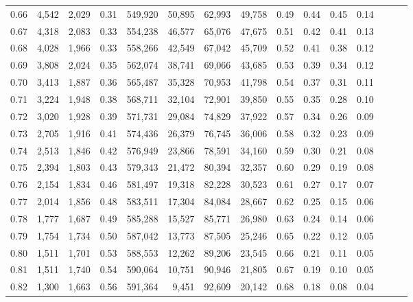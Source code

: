 \begin{tabular}{rrrrrrrrrrrrrrr}
0.66 &   4,542 &  2,029 &  0.31 &  549,920 &   50,895 &   62,993 &   49,758 &  0.49 &  0.44 &  0.45 &      0.14 \\
0.67 &   4,318 &  2,083 &  0.33 &  554,238 &   46,577 &   65,076 &   47,675 &  0.51 &  0.42 &  0.41 &      0.13 \\
0.68 &   4,028 &  1,966 &  0.33 &  558,266 &   42,549 &   67,042 &   45,709 &  0.52 &  0.41 &  0.38 &      0.12 \\
0.69 &   3,808 &  2,024 &  0.35 &  562,074 &   38,741 &   69,066 &   43,685 &  0.53 &  0.39 &  0.34 &      0.12 \\
0.70 &   3,413 &  1,887 &  0.36 &  565,487 &   35,328 &   70,953 &   41,798 &  0.54 &  0.37 &  0.31 &      0.11 \\
0.71 &   3,224 &  1,948 &  0.38 &  568,711 &   32,104 &   72,901 &   39,850 &  0.55 &  0.35 &  0.28 &      0.10 \\
0.72 &   3,020 &  1,928 &  0.39 &  571,731 &   29,084 &   74,829 &   37,922 &  0.57 &  0.34 &  0.26 &      0.09 \\
0.73 &   2,705 &  1,916 &  0.41 &  574,436 &   26,379 &   76,745 &   36,006 &  0.58 &  0.32 &  0.23 &      0.09 \\
0.74 &   2,513 &  1,846 &  0.42 &  576,949 &   23,866 &   78,591 &   34,160 &  0.59 &  0.30 &  0.21 &      0.08 \\
0.75 &   2,394 &  1,803 &  0.43 &  579,343 &   21,472 &   80,394 &   32,357 &  0.60 &  0.29 &  0.19 &      0.08 \\
0.76 &   2,154 &  1,834 &  0.46 &  581,497 &   19,318 &   82,228 &   30,523 &  0.61 &  0.27 &  0.17 &      0.07 \\
0.77 &   2,014 &  1,856 &  0.48 &  583,511 &   17,304 &   84,084 &   28,667 &  0.62 &  0.25 &  0.15 &      0.06 \\
0.78 &   1,777 &  1,687 &  0.49 &  585,288 &   15,527 &   85,771 &   26,980 &  0.63 &  0.24 &  0.14 &      0.06 \\
0.79 &   1,754 &  1,734 &  0.50 &  587,042 &   13,773 &   87,505 &   25,246 &  0.65 &  0.22 &  0.12 &      0.05 \\
0.80 &   1,511 &  1,701 &  0.53 &  588,553 &   12,262 &   89,206 &   23,545 &  0.66 &  0.21 &  0.11 &      0.05 \\
0.81 &   1,511 &  1,740 &  0.54 &  590,064 &   10,751 &   90,946 &   21,805 &  0.67 &  0.19 &  0.10 &      0.05 \\
0.82 &   1,300 &  1,663 &  0.56 &  591,364 &    9,451 &   92,609 &   20,142 &  0.68 &  0.18 &  0.08 &      0.04 \\

\end{tabular}
